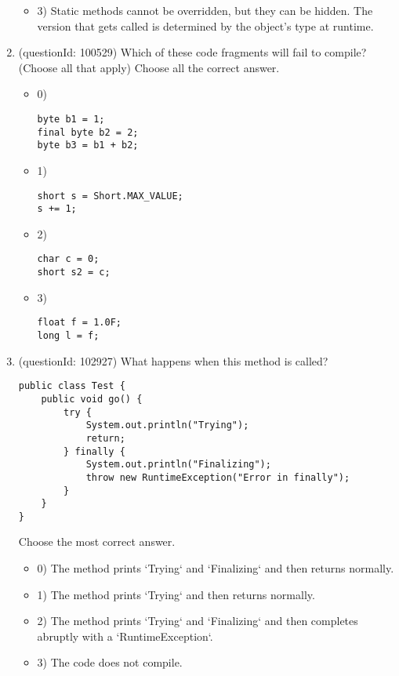 \documentclass[12pt]{article}
\begin{document}
\begin{enumerate}[label=(\arabic*)]
\begin{itemize}
\item 3) Static methods cannot be overridden, but they can be hidden. The version that gets called is determined by the object's type at runtime.

\end{itemize}
\item (questionId: 100529) Which of these code fragments will fail to compile? (Choose all that apply)
Choose all the correct answer.\begin{itemize}
\item 0) \begin{verbatim}
byte b1 = 1;
final byte b2 = 2;
byte b3 = b1 + b2;
\end{verbatim}

\item 1) \begin{verbatim}
short s = Short.MAX_VALUE;
s += 1;
\end{verbatim}

\item 2) \begin{verbatim}
char c = 0;
short s2 = c;
\end{verbatim}

\item 3) \begin{verbatim}
float f = 1.0F;
long l = f;
\end{verbatim}

\end{itemize}
\item (questionId: 102927) What happens when this method is called?
\begin{verbatim}
public class Test {
    public void go() {
        try {
            System.out.println("Trying");
            return;
        } finally {
            System.out.println("Finalizing");
            throw new RuntimeException("Error in finally");
        }
    }
}
\end{verbatim}
Choose the most correct answer. 
\begin{itemize}
\item 0) The method prints `Trying` and `Finalizing` and then returns normally.

\item 1) The method prints `Trying` and then returns normally.

\item 2) The method prints `Trying` and `Finalizing` and then completes abruptly with a `RuntimeException`.

\item 3) The code does not compile.


\end{itemize}
\end{enumerate}
\end{document}

